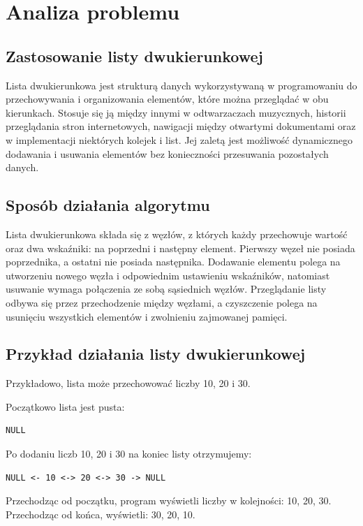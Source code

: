 \newpage
\section{Analiza problemu}

\subsection{Zastosowanie listy dwukierunkowej}
Lista dwukierunkowa jest strukturą danych wykorzystywaną w programowaniu do przechowywania i organizowania elementów, które można przeglądać w obu kierunkach. Stosuje się ją między innymi w odtwarzaczach muzycznych, historii przeglądania stron internetowych, nawigacji między otwartymi dokumentami oraz w implementacji niektórych kolejek i list. Jej zaletą jest możliwość dynamicznego dodawania i usuwania elementów bez konieczności przesuwania pozostałych danych.

\subsection{Sposób działania algorytmu}
Lista dwukierunkowa składa się z węzłów, z których każdy przechowuje wartość oraz dwa wskaźniki: na poprzedni i następny element. Pierwszy węzeł nie posiada poprzednika, a ostatni nie posiada następnika. Dodawanie elementu polega na utworzeniu nowego węzła i odpowiednim ustawieniu wskaźników, natomiast usuwanie wymaga połączenia ze sobą sąsiednich węzłów. Przeglądanie listy odbywa się przez przechodzenie między węzłami, a czyszczenie polega na usunięciu wszystkich elementów i zwolnieniu zajmowanej pamięci.

\subsection{Przykład działania listy dwukierunkowej}
Przykładowo, lista może przechowować liczby 10, 20 i 30.

Początkowo lista jest pusta:
\begin{verbatim}
NULL
\end{verbatim}

Po dodaniu liczb 10, 20 i 30 na koniec listy otrzymujemy:
\begin{verbatim}
NULL <- 10 <-> 20 <-> 30 -> NULL
\end{verbatim}

Przechodząc od początku, program wyświetli liczby w kolejności: 10, 20, 30. Przechodząc od końca, wyświetli: 30, 20, 10.

